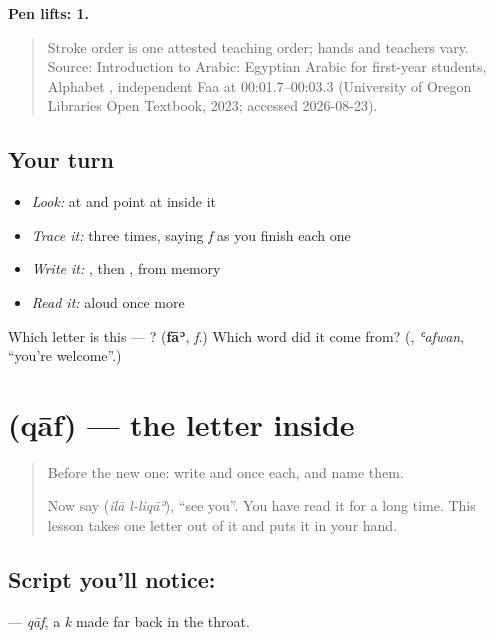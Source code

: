 \textbf{Pen lifts: 1.}

\begin{quote}
Stroke order is one attested teaching order; hands and teachers vary. Source: Introduction to Arabic: Egyptian Arabic for first-year students, Alphabet  , independent Faa at 00:01.7–00:03.3 (University of Oregon Libraries Open Textbook, 2023; accessed 2026-08-23).
\end{quote}

\subsection*{Your turn}
\begin{itemize}
\raggedright
  \item \emph{Look:} at \textbf{} and point at  inside it
  \item \emph{Trace it:}  three times, saying \emph{f} as you finish each one
  \item \emph{Write it:} , then , from memory
  \item \emph{Read it:} \textbf{} aloud once more
\end{itemize}

\begin{tcolorbox}[breakable,colback=teal!4,colframe=teal!35!black,title={Before you move on}]
Which letter is this — ? (\textbf{fāʾ}, \emph{f}.) Which word did it come from? (\textbf{}, \emph{ʿafwan}, \textquotedblleft{}you're welcome\textquotedblright{}.)
\end{tcolorbox}
\section[\texorpdfstring{\ar{ق} (qāf)}{ق (qāf)}]{ (qāf) — the letter inside }

\label{lesson:AR-W47-qaf}



\begin{quote}
Before the new one: write  and  once each, and name them.

Now say \textbf{ } (\emph{ilā l-liqāʾ}), \textquotedblleft{}see you\textquotedblright{}. You have read it for a long time. This lesson takes one letter out of it and puts it in your hand.
\end{quote}

\subsection*{Script you'll notice: }
\textbf{} — \emph{qāf}, a \emph{k} made far back in the throat.

